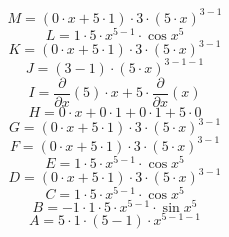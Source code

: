 \documentclass[12pt]{article}
\begin{document}
\begin{equation}
	M = 
\left( 0\cdot x + 5\cdot 1\right) \cdot 3\cdot \left( 5\cdot x\right) ^{3 - 1}
\end{equation}
\begin{equation}
	L = 
1\cdot 5\cdot x^{5 - 1}\cdot \cos {x^{5}}
\end{equation}
\begin{equation}
	K = 
\left( 0\cdot x + 5\cdot 1\right) \cdot 3\cdot \left( 5\cdot x\right) ^{3 - 1}
\end{equation}
\begin{equation}
	J = 
\left( 3 - 1\right) \cdot \left( 5\cdot x\right) ^{3 - 1 - 1}
\end{equation}
\begin{equation}
	I = 
\frac{\partial}{\partial x}\left( 5\right) \cdot x + 5\cdot \frac{\partial}{\partial x}\left( x\right) 
\end{equation}
\begin{equation}
	H = 
0\cdot x + 0\cdot 1 + 0\cdot 1 + 5\cdot 0
\end{equation}
\begin{equation}
	G = 
\left( 0\cdot x + 5\cdot 1\right) \cdot 3\cdot \left( 5\cdot x\right) ^{3 - 1}
\end{equation}
\begin{equation}
	F = 
\left( 0\cdot x + 5\cdot 1\right) \cdot 3\cdot \left( 5\cdot x\right) ^{3 - 1}
\end{equation}
\begin{equation}
	E = 
1\cdot 5\cdot x^{5 - 1}\cdot \cos {x^{5}}
\end{equation}
\begin{equation}
	D = 
\left( 0\cdot x + 5\cdot 1\right) \cdot 3\cdot \left( 5\cdot x\right) ^{3 - 1}
\end{equation}
\begin{equation}
	C = 
1\cdot 5\cdot x^{5 - 1}\cdot \cos {x^{5}}
\end{equation}
\begin{equation}
	B = 
-1\cdot 1\cdot 5\cdot x^{5 - 1}\cdot \sin {x^{5}}
\end{equation}
\begin{equation}
	A = 
5\cdot 1\cdot \left( 5 - 1\right) \cdot x^{5 - 1 - 1}
\end{equation}
\end{document}
